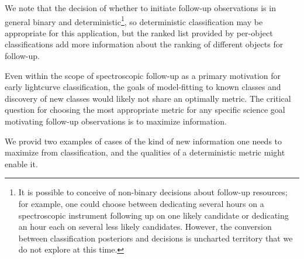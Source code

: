 
We note that the decision of whether to initiate follow-up observations is in general binary and deterministic\footnote{It is possible to conceive of non-binary decisions about follow-up resources; for example, one could choose between dedicating several hours on a spectroscopic instrument following up on one likely candidate or dedicating an hour each on several less likely candidates.  However, the conversion between classification posteriors and decisions is uncharted territory that we do not explore at this time.}, so deterministic classification may be appropriate for this application, but the ranked list provided by per-object classifications add more information about the ranking of different objects for follow-up.

Even within the scope of spectroscopic follow-up as a primary motivation for early lightcurve classification, the goals of model-fitting to known classes and discovery of new classes would likely not share an optimally metric. The critical question for choosing the most appropriate metric for any specific science goal motivating follow-up observations is to maximize information.

We provid two examples of cases of the kind of new information one needs to maximize from classification, and the qualities of a deterministic metric might enable it.

